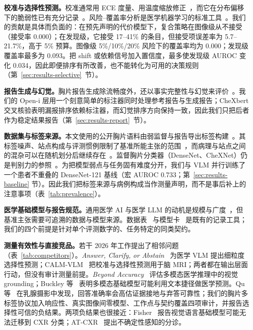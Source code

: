 \textbf{校准与选择性预测。}校准通常用 ECE 度量、用温度缩放修正~\citep{guo2017calibration}，而它在分布偏移下的脆弱性已有充分记录~\citep{ovadia2019trust}。风险--覆盖率分析是医学机器学习的标准工具~\citep{geifman2017selective,kompa2021second}。我们的贡献是具体而负面的：在预先声明的代价模型下，复合策略在图像级从不接受（接受率 0.000）；在发现级，它接受 17--41\% 的条目，但接受项误差率为 5.7--21.7\%，高于 5\% 预算。图像级 5\%/10\%/20\% 风险下的覆盖率均为 0.000；发现级覆盖率最多为 0.093。把 shift 或依赖信号加入置信度，最多使发现级 AUROC 变化 0.034，因此即便排序有所改善，也不能转化为可用的决策规则（第~\ref{sec:results-selective}~节）。

\textbf{报告生成与幻觉。}胸片报告生成除流畅度外，还以事实完整性与幻觉来评价~\citep{heiman2025factchexcker}。我们的 Open-i 层用一个刻意简单的标注器同时处理参考报告与生成报告；CheXbert 交叉核验表明漏报排序依赖标注器，而幻觉排序方向保持一致，因此我们只把后者作为稳定结果报告（第~\ref{sec:results-report}~节）。

\textbf{数据集与标签来源。}本文使用的公开胸片语料由弱监督与报告导出标签构建~\citep{wang2017chestxray8,bustos2020padchest,irvin2019chexpert,johnson2019mimic,chambon2024chexpertplus}。其标签噪声、站点构成与评测惯例限制了基准所能主张的范围~\citep{rafferty2026limitations}，而病理与站点之间的混杂可以在随机划分后继续存在~\citep{zech2018confounding}。监督胸片分类器（DenseNet、CheXNet）仍是判别力的参照~\citep{rajpurkar2017chexnet,huang2017densely}。为把模型弱点与任务固有难度分开，我们与 VLM 并行训练了一个患者不重叠的 DenseNet-121 基线（宏 AUROC 0.733；第~\ref{sec:results-baseline} 节）。因此我们把标签来源与病例构成当作测量声明，而不是事后补上的注意事项（表~\ref{tab:prevalence}）。

\textbf{医学基础模型与报告规范。}通用医学 AI 与医学 LLM 的动机是规模与广度~\citep{moor2023foundation,singhal2023medpalm,bommasani2021foundation}，但基准主张需要可追溯的数据与模型来源。数据表~\citep{gebru2021datasheets} 与模型卡~\citep{mitchell2019model} 是既有的记录工具；我们的四个前提是针对单个评测数字的、任务特定的同类契约。

\textbf{测量有效性与直接竞品。}若干 2026 年工作提出了相邻问题（表~\ref{tab:competitors}）。\emph{Answer, Clarify, or Abstain}~\citep{nguyen2026answer} 为医学 VLM 提出细粒度选择性预测；CALM-VLM~\citep{dhinagar2026calm} 把校准与选择性预测用于脑 MRI；两者都在输出层面行动，但没有审计测量前提。\emph{Beyond Accuracy}~\citep{zafar2026beyond} 评估多模态医学推理中的视觉 grounding；Buckley 等~\citep{buckley2026exploit} 表明多模态基础模型可能利用文本捷径做医学预测。Qu 等~\citep{qu2026accuracy} 在乳腺摄影中发现，回答准确率会高估证据接地与弃答可靠性；我们的胸片多标签协议加入响应性、真实图像间零模型、工作点与契约覆盖四项审计，并报告选择性可信的负结果。两项负结果也很接近：Fisher~\citep{fisher2025negative} 报告视觉语言基础模型可能无法迁移到 CXR 分类；AT-CXR~\citep{li2025atcxr} 提出不确定性感知的分诊。

